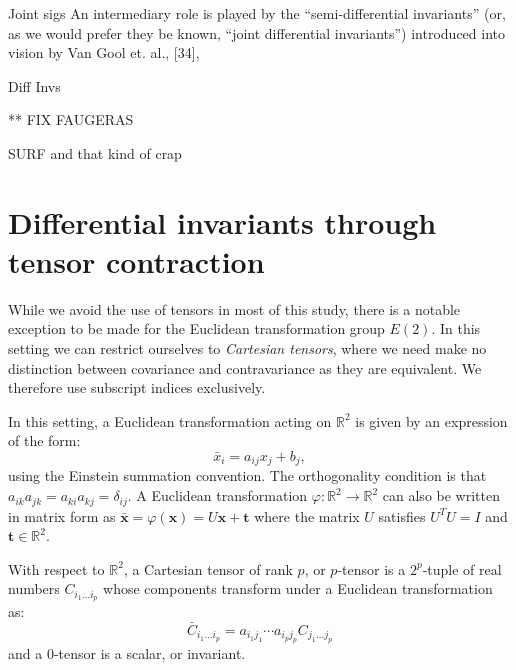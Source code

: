 \documentclass[review,onefignum,onetabnum]{siamonline190516}
\begin{document}
\cite{Faugeras1994}

Joint sigs
\cite{Fels1997,Olver2013,Arora2009}
An intermediary role is played by the “semi-differential invariants” (or, as we would
prefer they be known, “joint differential invariants”) introduced into vision by Van Gool et. al., [34],

Diff Invs
\cite{Florack1993,Olver2007,Bouton1898}








** FIX FAUGERAS

\cite{SURF}

SURF and that kind of crap


\section{Differential invariants through tensor contraction}
\label{sec:contraction}

While we avoid the use of tensors in most of this study, there is a notable
exception to be made for the Euclidean transformation group $E(2)$. In this
setting we can restrict ourselves to \emph{Cartesian tensors}, where we
need make no distinction between covariance and contravariance as they are
equivalent. We therefore use subscript indices exclusively.

In this setting, a Euclidean transformation acting on $\mathbb{R}^2$ is given
by an expression of the form:
\begin{equation*}
  \bar{x}_i = a_{ij}x_j + b_j,
\end{equation*}
using the Einstein summation convention. The orthogonality condition is
that $a_{ik}a_{jk} = a_{ki}a_{kj} = \delta_{ij}$. A Euclidean
transformation $\varphi \colon \mathbb{R}^2 \to \mathbb{R}^2$ can also be
written in matrix form as $\bar{\mathbf{x}} = \varphi(\mathbf{x}) =
U\mathbf{x} + \mathbf{t}$ where the matrix $U$ satisfies $U^TU = I$ and
$\mathbf{t} \in \mathbb{R}^2$.

With respect to $\mathbb{R}^2$, a Cartesian tensor of rank $p$, or $p$-tensor is a $2^p$-tuple of real numbers $C_{i_1\ldots i_p}$ whose components transform under a Euclidean transformation as:
\begin{equation*}
  \bar{C}_{i_1\ldots i_p} = a_{i_1j_1}\cdots a_{i_pj_p} C_{j_1\ldots j_p}
\end{equation*}
and a $0$-tensor is a scalar, or invariant. 
\end{document}
